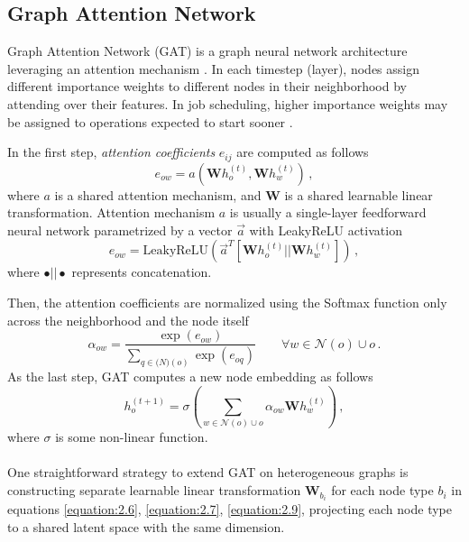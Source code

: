 \subsection{Graph Attention Network}
Graph Attention Network (GAT) is a graph neural network architecture leveraging an attention mechanism \cite{veličković2018graph}. In each timestep (layer), nodes assign different importance weights to different nodes in their neighborhood by attending over their features. In job scheduling, higher importance weights may be assigned to operations expected to start sooner \cite{9826438}.  
\newpage
\par
In the first step, \textit{attention coefficients} $e_{ij}$ are computed as follows \cite{9826438, veličković2018graph}
\begin{equation} \label{equation:2.6}
	e_{ow} = a\left ( \boldsymbol{W} h_o^{(t)}, \boldsymbol{W} h_w^{(t)}  \right ) \, ,
\end{equation}  
where $a$ is a shared attention mechanism, and $\boldsymbol{W}$ is a shared learnable linear transformation. Attention mechanism $a$ is usually a single-layer feedforward neural network parametrized by a vector $\vec{a}$ with LeakyReLU activation \cite{9826438, veličković2018graph, DBLP:journals/corr/abs-2105-14491}
\begin{equation} \label{equation:2.7}
	e_{ow} = \text{LeakyReLU}\left ( \vec{a}^T \left [ \boldsymbol{W}h_o^{(t)} || \boldsymbol{W}h_w^{(t)} \right ] \right ) \, ,
\end{equation}
where $\bullet||\bullet$ represents concatenation.
\par
Then, the attention coefficients are normalized using the Softmax function only across the neighborhood and the node itself \cite{9826438, veličković2018graph}
\begin{equation}
	\alpha_{ow} = \frac{\exp(e_{ow})}{\sum_{q \in \mathcal(N)(o)} \exp(e_{oq})} \hspace{2em} \forall w \in \mathcal{N}(o) \cup {o} \, .
\end{equation}
As the last step, GAT computes a new node embedding as follows \cite{9826438, veličković2018graph}
\begin{equation} \label{equation:2.9}
	h_o^{(t+1)} = \sigma \left ( \sum_{w \in \mathcal{N}(o) \cup {o}} \alpha_{ow} \boldsymbol{W} h_w^{(t)} \right ) \, ,
\end{equation}
where $\sigma$ is some non-linear function.\\
\\
One straightforward strategy to extend GAT on heterogeneous graphs is constructing separate learnable linear transformation $\boldsymbol{W}_{b_i}$ for each node type $b_i$ in equations \ref{equation:2.6}, \ref{equation:2.7}, \ref{equation:2.9}, projecting each node type to a shared latent space with the same dimension.